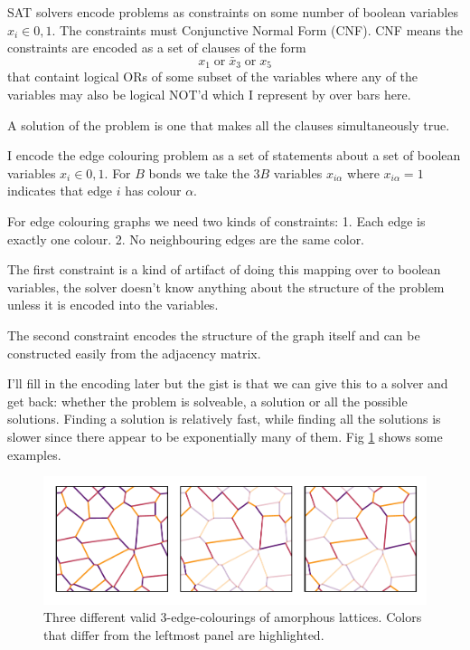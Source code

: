 SAT solvers encode problems as constraints on some number of boolean
variables \(x_i \in {0,1}\). The constraints must Conjunctive Normal
Form (CNF). CNF means the constraints are encoded as a set of clauses of
the form \[x_1 \;\textrm{or}\; \bar{x}_3 \;\textrm{or}\; x_5\] that
containt logical ORs of some subset of the variables where any of the
variables may also be logical NOT'd which I represent by over bars here.

A solution of the problem is one that makes all the clauses
simultaneously true.

I encode the edge colouring problem as a set of statements about a set
of boolean variables \(x_i \in {0,1}\). For \(B\) bonds we take the
\(3B\) variables \(x_{i\alpha}\) where \(x_{i\alpha} = 1\) indicates
that edge \(i\) has colour \(\alpha\).

For edge colouring graphs we need two kinds of constraints: 1. Each edge
is exactly one colour. 2. No neighbouring edges are the same color.

The first constraint is a kind of artifact of doing this mapping over to
boolean variables, the solver doesn't know anything about the structure
of the problem unless it is encoded into the variables.

The second constraint encodes the structure of the graph itself and can
be constructed easily from the adjacency matrix.

I'll fill in the encoding later but the gist is that we can give this to
a solver and get back: whether the problem is solveable, a solution or
all the possible solutions. Finding a solution is relatively fast, while
finding all the solutions is slower since there appear to be
exponentially many of them. Fig \ref{fig:multiple_colourings} shows some
examples.

\begin{figure}
\hypertarget{fig:multiple_colourings}{%
\centering
\includegraphics{figure_code/amk_chapter/multiple_colourings/multiple_colourings.pdf}
\caption{Three different valid 3-edge-colourings of amorphous lattices.
Colors that differ from the leftmost panel are
highlighted.}\label{fig:multiple_colourings}
}
\end{figure}

